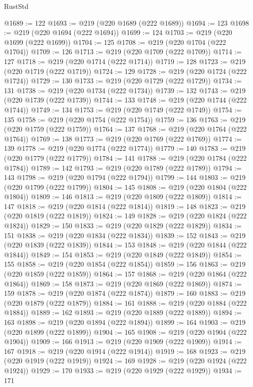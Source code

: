 \begin{lexlean}{RustStd}
\begin{coremodule}
@1689 := 122
@1693 := @219 (@220 @1689 (@222 @1689))
@1694 := 123
@1698 := @219 (@220 @1694 (@222 @1694))
@1699 := 124
@1703 := @219 (@220 @1699 (@222 @1699))
@1704 := 125
@1708 := @219 (@220 @1704 (@222 @1704))
@1709 := 126
@1713 := @219 (@220 @1709 (@222 @1709))
@1714 := 127
@1718 := @219 (@220 @1714 (@222 @1714))
@1719 := 128
@1723 := @219 (@220 @1719 (@222 @1719))
@1724 := 129
@1728 := @219 (@220 @1724 (@222 @1724))
@1729 := 130
@1733 := @219 (@220 @1729 (@222 @1729))
@1734 := 131
@1738 := @219 (@220 @1734 (@222 @1734))
@1739 := 132
@1743 := @219 (@220 @1739 (@222 @1739))
@1744 := 133
@1748 := @219 (@220 @1744 (@222 @1744))
@1749 := 134
@1753 := @219 (@220 @1749 (@222 @1749))
@1754 := 135
@1758 := @219 (@220 @1754 (@222 @1754))
@1759 := 136
@1763 := @219 (@220 @1759 (@222 @1759))
@1764 := 137
@1768 := @219 (@220 @1764 (@222 @1764))
@1769 := 138
@1773 := @219 (@220 @1769 (@222 @1769))
@1774 := 139
@1778 := @219 (@220 @1774 (@222 @1774))
@1779 := 140
@1783 := @219 (@220 @1779 (@222 @1779))
@1784 := 141
@1788 := @219 (@220 @1784 (@222 @1784))
@1789 := 142
@1793 := @219 (@220 @1789 (@222 @1789))
@1794 := 143
@1798 := @219 (@220 @1794 (@222 @1794))
@1799 := 144
@1803 := @219 (@220 @1799 (@222 @1799))
@1804 := 145
@1808 := @219 (@220 @1804 (@222 @1804))
@1809 := 146
@1813 := @219 (@220 @1809 (@222 @1809))
@1814 := 147
@1818 := @219 (@220 @1814 (@222 @1814))
@1819 := 148
@1823 := @219 (@220 @1819 (@222 @1819))
@1824 := 149
@1828 := @219 (@220 @1824 (@222 @1824))
@1829 := 150
@1833 := @219 (@220 @1829 (@222 @1829))
@1834 := 151
@1838 := @219 (@220 @1834 (@222 @1834))
@1839 := 152
@1843 := @219 (@220 @1839 (@222 @1839))
@1844 := 153
@1848 := @219 (@220 @1844 (@222 @1844))
@1849 := 154
@1853 := @219 (@220 @1849 (@222 @1849))
@1854 := 155
@1858 := @219 (@220 @1854 (@222 @1854))
@1859 := 156
@1863 := @219 (@220 @1859 (@222 @1859))
@1864 := 157
@1868 := @219 (@220 @1864 (@222 @1864))
@1869 := 158
@1873 := @219 (@220 @1869 (@222 @1869))
@1874 := 159
@1878 := @219 (@220 @1874 (@222 @1874))
@1879 := 160
@1883 := @219 (@220 @1879 (@222 @1879))
@1884 := 161
@1888 := @219 (@220 @1884 (@222 @1884))
@1889 := 162
@1893 := @219 (@220 @1889 (@222 @1889))
@1894 := 163
@1898 := @219 (@220 @1894 (@222 @1894))
@1899 := 164
@1903 := @219 (@220 @1899 (@222 @1899))
@1904 := 165
@1908 := @219 (@220 @1904 (@222 @1904))
@1909 := 166
@1913 := @219 (@220 @1909 (@222 @1909))
@1914 := 167
@1918 := @219 (@220 @1914 (@222 @1914))
@1919 := 168
@1923 := @219 (@220 @1919 (@222 @1919))
@1924 := 169
@1928 := @219 (@220 @1924 (@222 @1924))
@1929 := 170
@1933 := @219 (@220 @1929 (@222 @1929))
@1934 := 171

\end{coremodule}
\end{lexlean}
